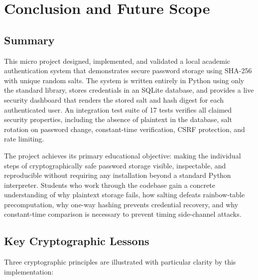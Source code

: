 \chapter{Conclusion and Future Scope}
\label{chap:conclusion}

\section{Summary}
\label{sec:conclusion_summary}

This micro project designed, implemented, and validated a local academic authentication system that demonstrates secure password storage using SHA-256 with unique random salts. The system is written entirely in Python using only the standard library, stores credentials in an SQLite database, and provides a live security dashboard that renders the stored salt and hash digest for each authenticated user. An integration test suite of 17 tests verifies all claimed security properties, including the absence of plaintext in the database, salt rotation on password change, constant-time verification, CSRF protection, and rate limiting.

The project achieves its primary educational objective: making the individual steps of cryptographically safe password storage visible, inspectable, and reproducible without requiring any installation beyond a standard Python interpreter. Students who work through the codebase gain a concrete understanding of why plaintext storage fails, how salting defeats rainbow-table precomputation, why one-way hashing prevents credential recovery, and why constant-time comparison is necessary to prevent timing side-channel attacks.

\section{Key Cryptographic Lessons}
\label{sec:conclusion_lessons}

Three cryptographic principles are illustrated with particular clarity by this implementation:

